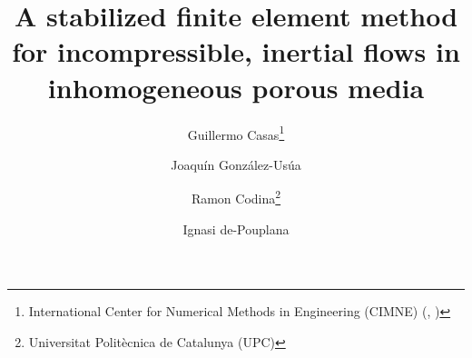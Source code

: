 

\usepackage{amsfonts}
\usepackage{graphicx}
\usepackage{epstopdf}
\usepackage{algorithmic}
\usepackage[algo2e,vlined,linesnumbered]{algorithm2e}
\ifpdf
\else
\fi

\newcommand{\creflastconjunction}{, and~}



\title{A stabilized finite element method for incompressible, inertial flows in inhomogeneous porous media}

\author{Guillermo Casas\thanks{International Center for Numerical Methods in Engineering (CIMNE) (, )}
\and Joaqu\'{i}n Gonz\'{a}lez-Us\'{u}a\footnotemark[1]
\and Ramon Codina\footnotemark[1] \thanks{Universitat Polit\`{e}cnica de Catalunya (UPC)}
\and Ignasi de-Pouplana\footnotemark[1] \footnotemark[2]}

\usepackage{amsopn}
\DeclareMathOperator{\diag}{diag}



